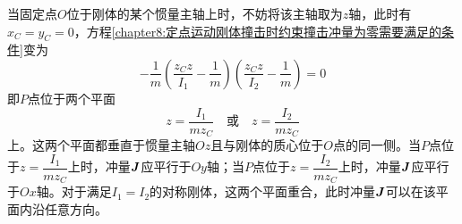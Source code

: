 当固定点$O$位于刚体的某个惯量主轴上时，不妨将该主轴取为$z$轴，此时有$x_C=y_C=0$，方程\eqref{chapter8:定点运动刚体撞击时约束撞击冲量为零需要满足的条件}变为
\begin{equation*}
	-\frac1m \left(\frac{z_Cz}{I_1}-\frac1m\right) \left(\frac{z_Cz}{I_2}-\frac1m\right) = 0
\end{equation*}
即$P$点位于两个平面
\begin{equation*}
	z = \frac{I_1}{mz_C}\quad \text{或}\quad z = \frac{I_2}{mz_C}
\end{equation*}
上。这两个平面都垂直于惯量主轴$Oz$且与刚体的质心位于$O$点的同一侧。当$P$点位于$z = \dfrac{I_1}{mz_C}$上时，冲量$\boldsymbol{J}$应平行于$Oy$轴；当$P$点位于$z = \dfrac{I_2}{mz_C}$上时，冲量$\boldsymbol{J}$应平行于$Ox$轴。对于满足$I_1=I_2$的对称刚体，这两个平面重合，此时冲量$\boldsymbol{J}$可以在该平面内沿任意方向。